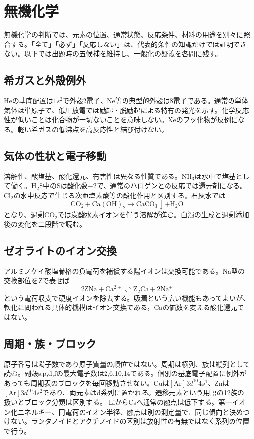 \chapter{無機化学}
無機化学の判断では、元素の位置、通常状態、反応条件、材料の用途を別々に照合する。「全て」「必ず」「反応しない」は、代表的条件の知識だけでは証明できない。以下では出題時の五候補を維持し、一般化の疑義を各問に残す。
\section{希ガスと外殻例外}\label{theory:inorganic:noble}
Heの基底配置は\(1s^2\)で外殻2電子、Ne等の典型的外殻は8電子である。通常の単体気体は単原子で、低圧放電では励起・脱励起による特有の発光を示す。化学反応性が低いことは化合物が一切ないことを意味しない。Xeのフッ化物が反例になる。軽い希ガスの低沸点を高反応性と結び付けない。\cite{inorganic_noble_ref,atomic_nist2019}
\section{気体の性状と電子移動}\label{theory:inorganic:gases}
溶解性、酸塩基、酸化還元、有害性は異なる性質である。NH$_3$は水中で塩基として働く。H$_2$S中のSは酸化数\(-2\)で、通常のハロゲンとの反応では還元剤になる。Cl$_2$の水中反応で生じる次亜塩素酸等の酸化作用と区別する。石灰水では
\[\mathrm{CO_2+Ca(OH)_2\to CaCO_3\downarrow+H_2O}\]
となり、過剰CO$_2$では炭酸水素イオンを伴う溶解が進む。白濁の生成と過剰添加後の変化を二段階で読む。\cite{inorganic_halogen_ref,inorganic_hydrogen_ref}
\section{ゼオライトのイオン交換}\label{theory:inorganic:exchange}
アルミノケイ酸塩骨格の負電荷を補償する陽イオンは交換可能である。Na型の交換部位をZで表せば
\[2\mathrm{ZNa}+\mathrm{Ca^{2+}}\rightleftharpoons\mathrm{Z_2Ca}+2\mathrm{Na^+}\]
という電荷収支で硬度イオンを除去する。吸着という広い機能もあってよいが、軟化に問われる具体的機構はイオン交換である。Caの価数を変える酸化還元ではない。\cite{inorganic_zeolite}
\section{周期・族・ブロック}\label{theory:inorganic:periodic}
原子番号は陽子数であり原子質量の順位ではない。周期は横列、族は縦列として読む。副殻s,p,d,fの最大電子数は2,6,10,14である。個別の基底電子配置に例外があっても周期表のブロックを毎回移動させない。Cuは\([\mathrm{Ar}]3d^{10}4s^1\)、Znは\([\mathrm{Ar}]3d^{10}4s^2\)であり、両元素はd系列に置かれる。遷移元素という用語の12族の扱いとブロック分類は区別する。\cite{atomic_nist2019}
LiからCsへ通常の融点は低下する。第一イオン化エネルギー、同電荷のイオン半径、融点は別の測定量で、同じ傾向と決めつけない。ランタノイドとアクチノイドの区別は放射性の有無ではなく系列の位置で行う。\cite{inorganic_alkali}
